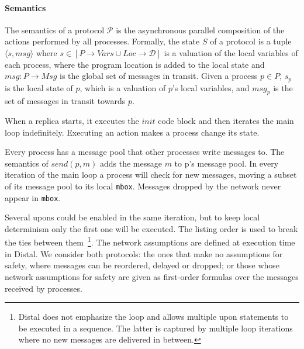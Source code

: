 \paragraph{Semantics} The semantics of a protocol $\mathcal{P}$ is the asynchronous parallel composition of the actions performed by all processes. Formally, the state $S$ of a protocol is a tuple $\langle s, \mathit{msg} \rangle$ where $s \in \left[ P \rightarrow \mathit{Vars} \cup \mathit{Loc} \rightarrow \mathcal{D} \right]$ is a valuation of the local variables of each process, where the program location is added to the local state and $\textit{msg}:P \rightarrow \mathit{Msg}$ is the global set of messages in transit. Given a process $p \in P$, $s_p$ is the local state of $p$, which is a valuation of $p$'s local variables, and $msg_p$ is the set of messages in transit towards $p$. 

When a replica starts, it executes the $\mathit{init}$ code block and then iterates the main loop indefinitely. 
Executing an action makes a process change its state.

Every process has a message pool that other processes write messages to. The semantics of $\mathit{send(p, m)}$ adds the  message $\mathit{m}$ to p's message pool. 
In every iteration of the main loop a process will check for new messages, moving a subset of its message pool to its local \texttt{mbox}.  
Messages dropped by the network never appear in \texttt{mbox}. 

Several upons could be enabled in the same iteration, but to keep local determinism only the first one will be executed. The listing order is used to break the ties between them~\footnote{Distal does not emphasize the loop and allows multiple upon statements to be executed in a sequence. The latter is captured by multiple loop iterations where no new messages are delivered in between.}. 
The network assumptions are defined at execution time in Distal. We consider both protocols: the ones that make no assumptions for safety, where messages can be reordered, delayed or dropped; or those whose network assumptions for safety are given as first-order formulas over the messages received by processes.









